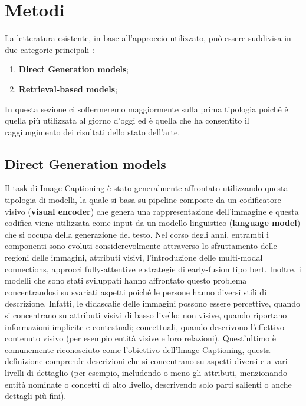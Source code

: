 \section{Metodi}
La letteratura esistente, in base all'approccio utilizzato, può essere suddivisa in due categorie principali \cite{bernardi2016automatic}: 
\begin{enumerate}
\item\textbf{Direct Generation models};
\item\textbf{Retrieval-based models};
\end{enumerate}
In questa sezione ci soffermeremo maggiormente sulla prima tipologia poiché è quella più utilizzata al giorno d'oggi ed è quella che ha consentito il raggiungimento dei risultati dello stato dell'arte.
\subsection{Direct Generation models}\label{directmodel}
Il task di Image Captioning è stato generalmente affrontato utilizzando questa tipologia di modelli, la quale si basa su pipeline composte da un codificatore visivo (\textbf{visual encoder}) che genera una rappresentazione dell'immagine e questa codifica viene utilizzata come input da un modello linguistico (\textbf{language model}) che si occupa della generazione del testo.
Nel corso degli anni, entrambi i componenti sono evoluti considerevolmente attraverso lo sfruttamento delle regioni delle immagini, attributi visivi, l'introduzione delle multi-modal connections, approcci fully-attentive e strategie di early-fusion tipo \acrshort{bert}. 
Inoltre, i modelli che sono stati sviluppati hanno affrontato questo problema concentrandosi su svariati aspetti poiché le persone hanno diversi stili di descrizione. Infatti, le didascalie delle immagini possono essere percettive, quando si concentrano su attributi visivi di basso livello; non visive, quando riportano informazioni implicite e contestuali; concettuali, quando descrivono l'effettivo contenuto visivo (per esempio entità visive e loro relazioni). Quest'ultimo è comunemente riconosciuto come l'obiettivo dell'Image Captioning, questa definizione comprende descrizioni che si concentrano su aspetti diversi e a vari livelli di dettaglio (per esempio, includendo o meno gli attributi, menzionando entità nominate o concetti di alto livello, descrivendo solo parti salienti o anche dettagli più fini). 

